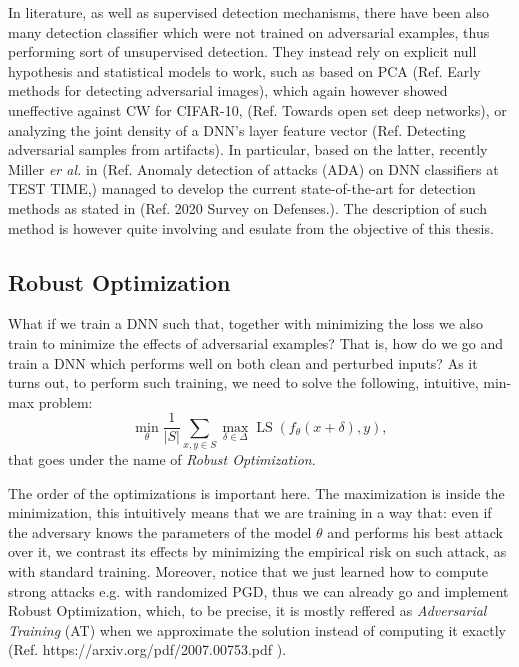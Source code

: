 \documentclass[LaM,binding=0.6cm]{./packages/sapthesis/sapthesis}
\begin{document}
            In literature, as well as supervised detection mechanisms, there have been also many 
            detection classifier which were not trained on adversarial examples, thus performing sort of unsupervised detection.
            They instead rely on explicit null hypothesis and statistical models to work, such as based on PCA (Ref. Early methods for
            detecting adversarial images), which again however showed uneffective against CW for CIFAR-10, (Ref. Towards open set
            deep networks), or analyzing the joint density of a DNN's layer feature vector (Ref. Detecting adversarial samples from artifacts).
            In particular, based on the latter, recently Miller \textit{er al.} in (Ref. Anomaly
            detection of attacks (ADA) on DNN classifiers at TEST TIME,) managed to develop the current state-of-the-art for detection
            methods as stated in (Ref. 2020 Survey on Defenses.). The description of such method is however quite involving and esulate from
            the objective of this thesis.
            
            
            \subsection{Robust Optimization}

                What if we train a DNN such that, together with minimizing the loss we also
                train to minimize the effects of adversarial examples? That is, how do we go and train
                a DNN which performs well on both clean and perturbed inputs? As it turns out, to perform
                such training, we need to solve the following, intuitive, min-max problem:
                \begin{equation}
                    \label{robopt}
                    \underset{\theta}{\operatorname{min}} \frac{1}{|S|} \sum_{x, y \in S} \max _{\delta \in \Delta} \operatorname{LS}\left(f_{\theta}(x+\delta), y\right),
                \end{equation}
                that goes under the name of \textit{Robust Optimization}.
                
                The order of the optimizations is important here. The maximization is inside the minimization, this
                intuitively means that we are training in a way that: even if the adversary knows the 
                parameters of the model $\theta$ and performs his best attack over it, we contrast
                its effects by minimizing the empirical risk on such attack, as with standard training.
                Moreover, notice that we just learned how to compute strong attacks e.g. with randomized PGD, thus we
                can already go and implement Robust Optimization, which, to be precise, it is mostly reffered as \textit{Adversarial
                Training} (AT) when we approximate the solution instead of computing it exactly (Ref. https://arxiv.org/pdf/2007.00753.pdf ).
\end{document}
